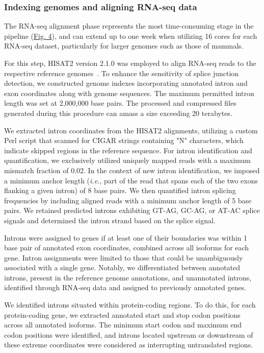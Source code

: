\subsubsection{Indexing genomes and aligning RNA-seq data}
The RNA-seq alignment phase represents the most time-consuming stage in the pipeline (\hyperref[fig:gtdrift4]{Fig. 4}), and can extend up to one week when utilizing 16 cores for each RNA-seq dataset, particularly for larger genomes such as those of mammals.

For this step, HISAT2 version 2.1.0 was employed to align RNA-seq reads to the respective reference genomes~\citep{kim_graph-based_2019}. To enhance the sensitivity of splice junction detection, we constructed genome indexes incorporating annotated intron and exon coordinates along with genome sequences. The maximum permitted intron length was set at 2,000,000 base pairs. The processed and compressed files generated during this procedure can amass a size exceeding 20 terabytes.

We extracted intron coordinates from the HISAT2 alignments, utilizing a custom Perl script that scanned for CIGAR strings containing "N" characters, which indicate skipped regions in the reference sequence. For intron identification and quantification, we exclusively utilized uniquely mapped reads with a maximum mismatch fraction of 0.02. In the context of new intron identification, we imposed a minimum anchor length (\textit{i.e.}, part of the read that spans each of the two exons flanking a given intron) of 8 base pairs. We then quantified intron splicing frequencies by including aligned reads with a minimum anchor length of 5 base pairs. We retained predicted introns exhibiting GT-AG, GC-AG, or AT-AC splice signals and determined the intron strand based on the splice signal.

Introns were assigned to genes if at least one of their boundaries was within 1 base pair of annotated exon coordinates, combined across all isoforms for each gene. Intron assignments were limited to those that could be unambiguously associated with a single gene. Notably, we differentiated between annotated introns, present in the reference genome annotations, and unannotated introns, identified through RNA-seq data and assigned to previously annotated genes.

We identified introns situated within protein-coding regions. To do this, for each protein-coding gene, we extracted annotated start and stop codon positions across all annotated isoforms. The minimum start codon and maximum end codon positions were identified, and introns located upstream or downstream of these extreme coordinates were considered as interrupting untranslated regions.

